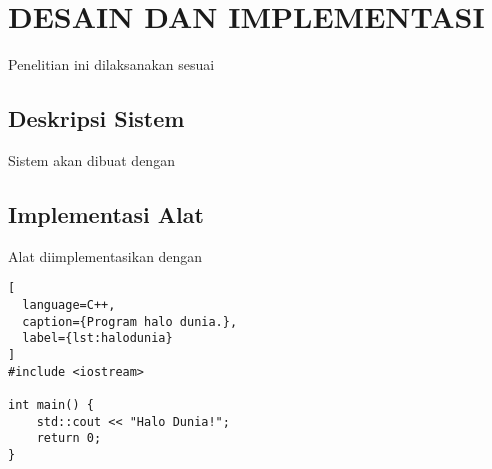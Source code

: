 \chapter{DESAIN DAN IMPLEMENTASI}
\label{chap:desainimplementasi}


Penelitian ini dilaksanakan sesuai \lipsum[1][1-5]

\section{Deskripsi Sistem}
\label{sec:deskripsisistem}

Sistem akan dibuat dengan \lipsum[1-2]

\section{Implementasi Alat
  \label{sec:implementasi alat}}

Alat diimplementasikan dengan \lipsum[1]

\begin{lstlisting}[
  language=C++,
  caption={Program halo dunia.},
  label={lst:halodunia}
]
#include <iostream>

int main() {
    std::cout << "Halo Dunia!";
    return 0;
}
\end{lstlisting}

\lipsum[2-3]



\lipsum[4]
